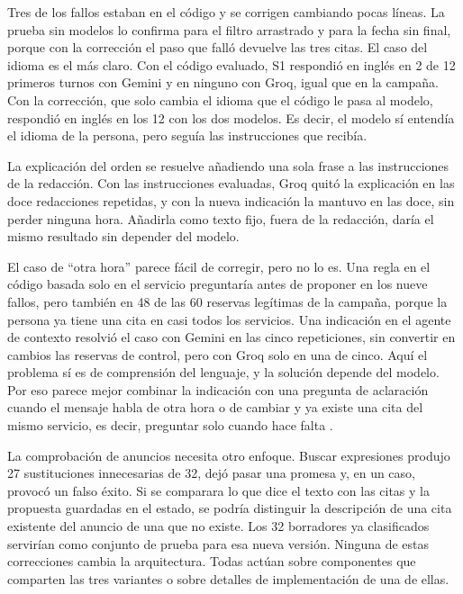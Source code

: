 \begin{table}[!htbp]
\centering
\small
\caption[Comprobaciones con los modelos.]{Comprobaciones con los modelos
posteriores a la campaña. El idioma se mide en los doce primeros mensajes
distintos de los episodios en inglés de S1, la interpretación en cinco
repeticiones del primer mensaje de N-R02 y en dos repeticiones de cuatro
reservas de control, y la redacción en tres repeticiones de cuatro episodios.}
\label{tab:comprobaciones}

\end{table}

Tres de los fallos estaban en el código y se corrigen cambiando pocas líneas.
La prueba sin modelos lo confirma para el filtro arrastrado y para la fecha sin
final, porque con la corrección el paso que falló devuelve las tres citas. El
caso del idioma es el más claro. Con el código evaluado, S1 respondió en inglés
en 2 de 12 primeros turnos con Gemini y en ninguno con Groq, igual que en la
campaña. Con la corrección, que solo cambia el idioma que el código le pasa al
modelo, respondió en inglés en los 12 con los dos modelos. Es decir, el modelo
sí entendía el idioma de la persona, pero seguía las instrucciones que
recibía.

La explicación del orden se resuelve añadiendo una sola frase a las
instrucciones de la redacción. Con las instrucciones evaluadas, Groq quitó la
explicación en las doce redacciones repetidas, y con la nueva indicación la
mantuvo en las doce, sin perder ninguna hora. Añadirla como texto fijo, fuera
de la redacción, daría el mismo resultado sin depender del modelo.

El caso de \enquote{otra hora} parece fácil de corregir, pero no lo es. Una
regla en el código basada solo en el servicio preguntaría antes de proponer en
los nueve fallos, pero también en 48 de las 60 reservas legítimas de la
campaña, porque la persona ya tiene una cita en casi todos los servicios. Una
indicación en el agente de contexto resolvió el caso con Gemini en las cinco
repeticiones, sin convertir en cambios las reservas de control, pero con Groq
solo en una de cinco. Aquí el problema sí es de comprensión del lenguaje, y la
solución depende del modelo. Por eso parece mejor combinar la indicación con
una pregunta de aclaración cuando el mensaje habla de otra hora o de cambiar y
ya existe una cita del mismo servicio, es decir, preguntar solo cuando hace
falta \citep{zhang2025clarify}.

La comprobación de anuncios necesita otro enfoque. Buscar expresiones produjo
27 sustituciones innecesarias de 32, dejó pasar una promesa y, en un caso,
provocó un falso éxito. Si se comparara lo que dice el texto con las citas y
la propuesta guardadas en el estado, se podría distinguir la descripción de una
cita existente del anuncio de una que no existe. Los 32 borradores ya
clasificados servirían como conjunto de prueba para esa nueva versión. Ninguna
de estas correcciones cambia la arquitectura. Todas actúan sobre componentes
que comparten las tres variantes o sobre detalles de implementación de una de
ellas.

